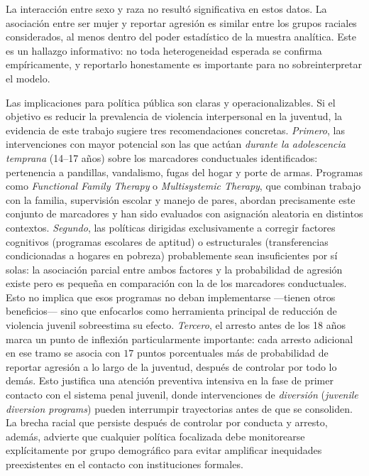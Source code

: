 \documentclass[11pt]{article}
\begin{document}
La interacción entre sexo y raza no resultó significativa en estos datos. La asociación entre ser mujer y reportar agresión es similar entre los grupos raciales considerados, al menos dentro del poder estadístico de la muestra analítica. Este es un hallazgo informativo: no toda heterogeneidad esperada se confirma empíricamente, y reportarlo honestamente es importante para no sobreinterpretar el modelo.

Las implicaciones para política pública son claras y operacionalizables. Si el objetivo es reducir la prevalencia de violencia interpersonal en la juventud, la evidencia de este trabajo sugiere tres recomendaciones concretas. \textit{Primero}, las intervenciones con mayor potencial son las que actúan \textit{durante la adolescencia temprana} (14--17 años) sobre los marcadores conductuales identificados: pertenencia a pandillas, vandalismo, fugas del hogar y porte de armas. Programas como \textit{Functional Family Therapy} o \textit{Multisystemic Therapy}, que combinan trabajo con la familia, supervisión escolar y manejo de pares, abordan precisamente este conjunto de marcadores y han sido evaluados con asignación aleatoria en distintos contextos. \textit{Segundo}, las políticas dirigidas exclusivamente a corregir factores cognitivos (programas escolares de aptitud) o estructurales (transferencias condicionadas a hogares en pobreza) probablemente sean insuficientes por sí solas: la asociación parcial entre ambos factores y la probabilidad de agresión existe pero es pequeña en comparación con la de los marcadores conductuales. Esto no implica que esos programas no deban implementarse —tienen otros beneficios— sino que enfocarlos como herramienta principal de reducción de violencia juvenil sobreestima su efecto. \textit{Tercero}, el arresto antes de los 18 años marca un punto de inflexión particularmente importante: cada arresto adicional en ese tramo se asocia con $17$ puntos porcentuales más de probabilidad de reportar agresión a lo largo de la juventud, después de controlar por todo lo demás. Esto justifica una atención preventiva intensiva en la fase de primer contacto con el sistema penal juvenil, donde intervenciones de \textit{diversión} (\textit{juvenile diversion programs}) pueden interrumpir trayectorias antes de que se consoliden. La brecha racial que persiste después de controlar por conducta y arresto, además, advierte que cualquier política focalizada debe monitorearse explícitamente por grupo demográfico para evitar amplificar inequidades preexistentes en el contacto con instituciones formales.
\end{document}
